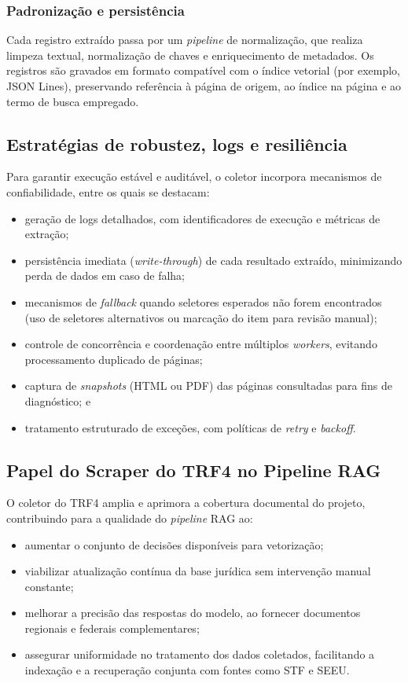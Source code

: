 \subsubsection{Padronização e persistência}
Cada registro extraído passa por um \textit{pipeline} de normalização, que realiza limpeza textual, normalização de chaves e enriquecimento de metadados. Os registros são gravados em formato compatível com o índice vetorial (por exemplo, JSON Lines), preservando referência à página de origem, ao índice na página e ao termo de busca empregado.

\subsection{Estratégias de robustez, logs e resiliência}
Para garantir execução estável e auditável, o coletor incorpora mecanismos de confiabilidade, entre os quais se destacam:
\begin{itemize}
  \item geração de logs detalhados, com identificadores de execução e métricas de extração;
  \item persistência imediata (\textit{write-through}) de cada resultado extraído, minimizando perda de dados em caso de falha;
  \item mecanismos de \textit{fallback} quando seletores esperados não forem encontrados (uso de seletores alternativos ou marcação do item para revisão manual);
  \item controle de concorrência e coordenação entre múltiplos \textit{workers}, evitando processamento duplicado de páginas;
  \item captura de \textit{snapshots} (HTML ou PDF) das páginas consultadas para fins de diagnóstico; e
  \item tratamento estruturado de exceções, com políticas de \textit{retry} e \textit{backoff}.
\end{itemize}

\subsection{Papel do Scraper do TRF4 no Pipeline RAG}
O coletor do TRF4 amplia e aprimora a cobertura documental do projeto, contribuindo para a qualidade do \textit{pipeline} RAG ao:
\begin{itemize}
  \item aumentar o conjunto de decisões disponíveis para vetorização;
  \item viabilizar atualização contínua da base jurídica sem intervenção manual constante;
  \item melhorar a precisão das respostas do modelo, ao fornecer documentos regionais e federais complementares;
  \item assegurar uniformidade no tratamento dos dados coletados, facilitando a indexação e a recuperação conjunta com fontes como STF e SEEU.
\end{itemize}

